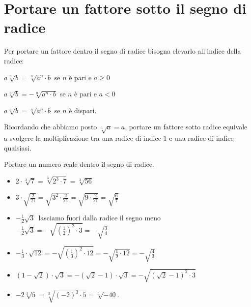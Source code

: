 \section{Portare un fattore sotto il segno di radice}
\label{sec:radici_portare_dentro}

Per portare un fattore dentro il segno di radice bisogna elevarlo all'indice 
della radice:
\begin{itemize*}
 \item $a\sqrt[n]b=\sqrt[n]{a^n\cdot b}$ se $n$ è pari e $a\ge 0$
 \item $a\sqrt[n]b=-\sqrt[n]{a^n\cdot b}$ se $n$ è pari e $a<0$
 \item $a\sqrt[n]b=\sqrt[n]{a^n\cdot b}$ se $n$ è dispari.
\end{itemize*}

Ricordando che abbiamo posto $\sqrt[1]a=a$, portare un fattore sotto radice 
equivale a svolgere la moltiplicazione tra una radice di indice $1$ e una 
radice di indice qualsiasi.
 \begin{esempio}
 Portare un numero reale dentro il segno di radice.
 \begin{itemize}
 \item $2\cdot \sqrt[3]7=\sqrt[3]{2^3\cdot 7}=\sqrt[3]{56}$
 \item $3\cdot \sqrt{\frac 2{21}}=\sqrt{3^2\cdot \frac 2{21}}=
        \sqrt{9\cdot \frac 2{21}}=\sqrt{\frac 6 7}$
 \item $-\frac 1 2\sqrt 3$\, lasciamo fuori dalla radice il segno meno 
       $-\frac 1 2\sqrt 3=-\sqrt{\left(\frac 1 2\right)^2\cdot 3}=
        -\sqrt{\frac 3 4}$
 \item $-\frac 1 3\cdot \sqrt{12}=-\sqrt{\left(\frac 1 3\right)^2\cdot 12}=
        -\sqrt{\frac 1 9\cdot 12}=-\sqrt{\frac 4 3}$
 \item $(1-\sqrt 2)\cdot \sqrt 3=-(\sqrt 2-1)\cdot \sqrt 3=
        -\sqrt{(\sqrt 2-1)^2\cdot 3}$
 \item $-2\sqrt[3]5=\sqrt[3]{(-2)^3\cdot 5}=\sqrt[3]{-40}$.
 \end{itemize}
 \end{esempio}

